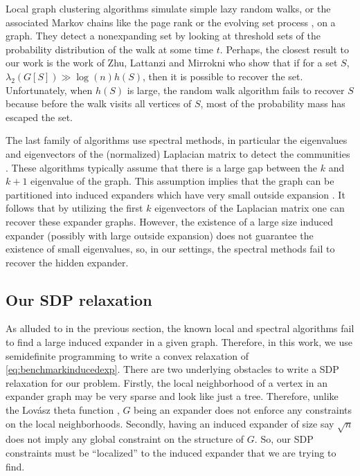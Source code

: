\documentclass[11pt]{article}
\begin{document}
Local graph clustering algorithms \cite{ST08,ACL06,AP09,OT12,ZLM13} simulate simple lazy random walks, or the associated Markov chains like the page rank \cite{ACL06} or the evolving set process \cite{MP03}, on a graph. They detect a nonexpanding set by looking at threshold sets of the probability distribution of the walk at some time $t$.
Perhaps, the closest result to our work is the  work of Zhu, Lattanzi and Mirrokni \cite{ZLM13} who show that if for a set $S$, $\lambda_2(G[S]) \gg \log(n)h(S)$,   then it is possible to recover the set. Unfortunately, when $h(S)$ is large, the random walk algorithm fails to recover $S$ because before the walk visits all vertices of $S$, most of the probability mass has escaped the set.

The last family of algorithms use spectral methods, in particular the eigenvalues and eigenvectors of the (normalized) Laplacian matrix to detect the communities \cite{LOT12,LRTV11,OT14,DPRS14,PSZ15,Sin16}. These algorithms typically assume that there is a large gap between the $k$ and $k+1$ eigenvalue of the graph. This assumption implies that the graph can be partitioned into induced expanders which have very small outside expansion \cite{OT14}. It follows that by utilizing the first $k$ eigenvectors of the Laplacian matrix one can recover these expander graphs. However, the existence of a large size induced expander (possibly with large outside expansion) does not  guarantee the existence of small eigenvalues, so, in our settings, the spectral methods fail to recover the hidden expander.




\subsection{Our SDP relaxation}
As alluded to in the previous section, the known local and spectral algorithms fail to find a large induced expander in a given graph. Therefore, in this work, we use semidefinite programming to write a convex relaxation of \eqref{eq:benchmarkinducedexp}. 
There are two underlying obstacles to write a SDP relaxation for our problem. Firstly, the local neighborhood of a vertex in an expander graph may be very sparse and look like just a tree. Therefore, unlike the Lov\'asz theta function \cite{Lov79}, $G$ being an expander does not enforce any constraints on the local neighborhoods. 
Secondly, having an induced expander of size say $\sqrt{n}$ does not imply any global constraint on the structure of $G$. So, our SDP constraints must be ``localized''   to the induced expander that we are trying to find.
\end{document}
